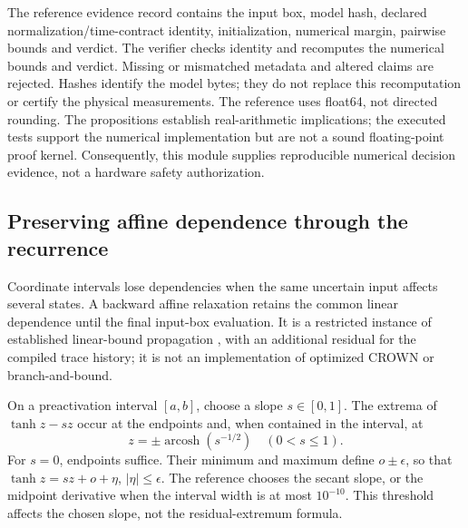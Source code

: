 \documentclass[11pt,a4paper]{article}
\theoremstyle{definition}\newtheorem{definition}[theorem]{Definition}
\begin{document}
The reference evidence record contains the input box, model hash, declared normalization/time-contract identity, initialization, numerical margin, pairwise bounds and verdict. The verifier checks identity and recomputes the numerical bounds and verdict. Missing or mismatched metadata and altered claims are rejected. Hashes identify the model bytes; they do not replace this recomputation or certify the physical measurements. The reference uses float64, not directed rounding. The propositions establish real-arithmetic implications; the executed tests support the numerical implementation but are not a sound floating-point proof kernel. Consequently, this module supplies reproducible numerical decision evidence, not a hardware safety authorization.

\subsection{Preserving affine dependence through the recurrence}\label{sec:affineobserver}
Coordinate intervals lose dependencies when the same uncertain input affects several states. A backward affine relaxation retains the common linear dependence until the final input-box evaluation. It is a restricted instance of established linear-bound propagation \cite{zhang2018crown}, with an additional residual for the compiled trace history; it is not an implementation of optimized CROWN or branch-and-bound.

On a preactivation interval $[a,b]$, choose a slope $s\in[0,1]$. The extrema of $\tanh z-sz$ occur at the endpoints and, when contained in the interval, at
\[
 z=\pm\operatorname{arcosh}(s^{-1/2})\quad(0<s\leq1).
\]
For $s=0$, endpoints suffice. Their minimum and maximum define $o\pm\epsilon$, so that $\tanh z=sz+o+\eta$, $|\eta|\leq\epsilon$. The reference chooses the secant slope, or the midpoint derivative when the interval width is at most $10^{-10}$. This threshold affects the chosen slope, not the residual-extremum formula.
\end{document}
